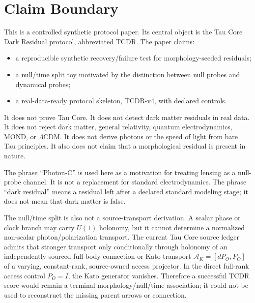 \documentclass[11pt]{article}
\begin{document}
\section{Claim Boundary}

This is a controlled synthetic protocol paper.  Its central object is the
Tau Core Dark Residual protocol, abbreviated TCDR.  The paper claims:
\begin{itemize}
  \item a reproducible synthetic recovery/failure test for morphology-seeded
  residuals;
  \item a null/time split toy motivated by the distinction between null probes
  and dynamical probes;
  \item a real-data-ready protocol skeleton, TCDR-v4, with declared controls.
\end{itemize}

It does not prove Tau Core.  It does not detect dark matter residuals in real
data.  It does not reject dark matter, general relativity, quantum
electrodynamics, MOND, or \(\Lambda\)CDM.  It does not derive photons or the
speed of light from bare Tau principles.  It also does not claim that a
morphological residual is present in nature.

The phrase ``Photon-C'' is used here as a motivation for treating lensing as a
null-probe channel.  It is not a replacement for standard electrodynamics.
The phrase ``dark residual'' means a residual left after a declared standard
modeling stage; it does not mean that dark matter is false.

The null/time split is also not a source-transport derivation. A scalar phase
or clock branch may carry \(U(1)\) holonomy, but it cannot determine a
normalized non-scalar photon/polarization transport. The current Tau Core
source ledger admits that stronger transport only conditionally through
holonomy of an independently sourced full body connection or Kato transport
\(\mathcal A_K=[dP_O,P_O]\) of a varying, constant-rank, source-owned access
projector. In the direct full-rank access control \(P_O=I\), the Kato
generator vanishes. Therefore a successful TCDR score would remain a
terminal morphology/null/time association; it could not be used to reconstruct
the missing parent arrows or connection.
\end{document}
